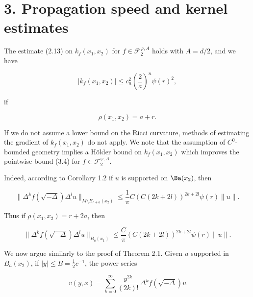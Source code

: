 \chapter{3. Propagation speed and kernel estimates}

The estimate (2.13) on $k_f(x_1,x_2)$ for $f\in \mathscr{F}_2^{\varphi,A}$ holds with $A=d/2$, and we have

\begin{equation}\tag{3.4}
|k_f(x_1,x_2)|\le c_n^2\left(\frac{2}{a}\right)^n \psi(r)^2,
\end{equation}

if

\begin{equation}\tag{3.5}
\rho(x_1,x_2)=a+r.
\end{equation}

If we do not assume a lower bound on the Ricci curvature, methods of estimating the gradient of $k_f(x_1,x_2)$ do not apply. We note that the assumption of $C^0$-bounded geometry implies a H\"older bound on $k_f(x_1,x_2)$ which improves the pointwise bound (3.4) for $f\in \mathscr{F}_2^{\varphi,A}$.

Indeed, according to Corollary 1.2 if $u$ is supported on $\Ba(x_2)$, then

\begin{equation}\tag{3.6}
\bigl\|\Delta^k f(\sqrt{-\Delta}) \Delta^l u\bigr\|_{M\setminus B_{r+a}(x_2)}
\le \frac{1}{\pi} C(C(2k+2l))^{2k+2l}\psi(r)\|u\|.
\end{equation}

Thus if $\rho(x_1,x_2)=r+2a$, then

\begin{equation}\tag{3.7}
\bigl\|\Delta^k f(\sqrt{-\Delta}) \Delta^l u\bigr\|_{B_a(x_1)}
\le \frac{C}{\pi}(C(2k+2l))^{2k+2l}\psi(r)\|u\|.
\end{equation}

We now argue similarly to the proof of Theorem 2.1. Given $u$ supported in $B_a(x_2)$, if $|y|\le B=\tfrac12 c^{-1}$, the power series

\begin{equation}\tag{3.8}
v(y,x)=\sum_{k=0}^{\infty}\frac{y^{2k}}{(2k)!}\,\Delta^k f(\sqrt{-\Delta})u
\end{equation}

